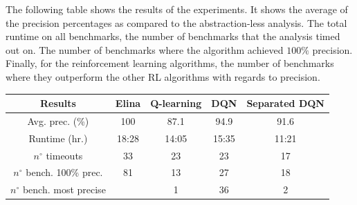 The following table shows the results of the experiments. It shows the average of the precision percentages as compared to the abstraction-less analysis. The total runtime on all benchmarks, the number of benchmarks that the analysis timed out on. The number of benchmarks where the algorithm achieved $100\%$ precision. Finally, for the reinforcement learning algorithms, the number of benchmarks where they outperform the other RL algorithms with regards to precision. 

\begin{center}
\begin{tabular}{||c c c c c||}
 
 \hline
 Results & Elina & Q-learning & DQN & Separated DQN \\ [0.5ex] 
 \hline\hline
 Avg. prec. (\%) & 100 & 87.1 & 94.9 & 91.6\\
 Runtime (hr.) & 18:28 & 14:05 & 15:35 & 11:21\\
 $n^{\circ}$ timeouts & 33 & 23 & 23 & 17\\
 $n^{\circ}$ bench. 100\% prec. & 81 & 13 & 27 & 18\\
 $n^{\circ}$ bench. most precise &  & 1 & 36 & 2\\
 
 \hline
\end{tabular}
\end{center}

